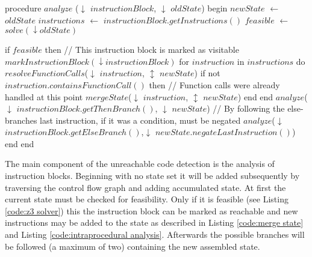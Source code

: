 \begin{program}[h!]
	\begin{GenericCode}
procedure $analyze$ ($\downarrow$ $instructionBlock$, $\downarrow$ $oldState$) begin
	$newState$ $\leftarrow$ $oldState$
	$instructions$ $\leftarrow$ $instructionBlock.getInstructions()$
	$feasible$ $\leftarrow$ $solve(\downarrow oldState)$
		
	if $feasible$ then
		// This instruction block is marked as visitable
		$markInstructionBlock(\downarrow instructionBlock)$ 
		for $instruction$ in $instructions$ do
			$resolveFunctionCalls$($\downarrow$ $instruction$, $\updownarrow$ $newState$)	
			if not $instruction.containsFunctionCall()$ then
				// Function calls were already handled at this point
				$mergeState$($\downarrow$ $instruction$, $\updownarrow$ $newState$)
			end 
		end
		$analyze$($\downarrow$ $instructionBlock.getThenBranch()$, $\downarrow$ $newState$)
		// By following the else-branches last instruction, if it was a condition, must be negated
		$analyze$($\downarrow$ $instructionBlock.getElseBranch()$,$\downarrow$ $newState.negateLastInstruction()$)
	end
end	\end{GenericCode}

	\caption{The main component of the unreachable code detection is the analysis of instruction blocks. Beginning with no state set it will be added subsequently by traversing the control flow graph and adding accumulated state. 
	At first the current state must be checked for feasibility. Only if it is feasible (see Listing \ref{code:z3 solver}) this the instruction block can be marked as reachable and new instructions may be added to the state as described in Listing \ref{code:merge state} and Listing \ref{code:intraprocedural analysis}.	
	Afterwards the possible branches will be followed (a maximum of two) containing the new assembled state.}
	\label{code:instruction block analyzer}
\end{program}


